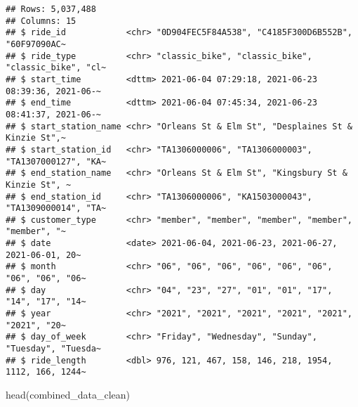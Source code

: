 \documentclass[
]{article}
\newenvironment{Shaded}{\begin{snugshade}}{\end{snugshade}}
\newcommand{\FunctionTok}[1]{\textcolor[rgb]{0.00,0.00,0.00}{#1}}
\newcommand{\NormalTok}[1]{#1}
\begin{document}
\begin{verbatim}
## Rows: 5,037,488
## Columns: 15
## $ ride_id            <chr> "0D904FEC5F84A538", "C4185F300D6B552B", "60F97090AC~
## $ ride_type          <chr> "classic_bike", "classic_bike", "classic_bike", "cl~
## $ start_time         <dttm> 2021-06-04 07:29:18, 2021-06-23 08:39:36, 2021-06-~
## $ end_time           <dttm> 2021-06-04 07:45:34, 2021-06-23 08:41:37, 2021-06-~
## $ start_station_name <chr> "Orleans St & Elm St", "Desplaines St & Kinzie St",~
## $ start_station_id   <chr> "TA1306000006", "TA1306000003", "TA1307000127", "KA~
## $ end_station_name   <chr> "Orleans St & Elm St", "Kingsbury St & Kinzie St", ~
## $ end_station_id     <chr> "TA1306000006", "KA1503000043", "TA1309000014", "TA~
## $ customer_type      <chr> "member", "member", "member", "member", "member", "~
## $ date               <date> 2021-06-04, 2021-06-23, 2021-06-27, 2021-06-01, 20~
## $ month              <chr> "06", "06", "06", "06", "06", "06", "06", "06", "06~
## $ day                <chr> "04", "23", "27", "01", "01", "17", "14", "17", "14~
## $ year               <chr> "2021", "2021", "2021", "2021", "2021", "2021", "20~
## $ day_of_week        <chr> "Friday", "Wednesday", "Sunday", "Tuesday", "Tuesda~
## $ ride_length        <dbl> 976, 121, 467, 158, 146, 218, 1954, 1112, 166, 1244~
\end{verbatim}

\begin{Shaded}
\begin{Highlighting}[]
\FunctionTok{head}\NormalTok{(combined\_data\_clean)}
\end{Highlighting}
\end{Shaded}
\end{document}
